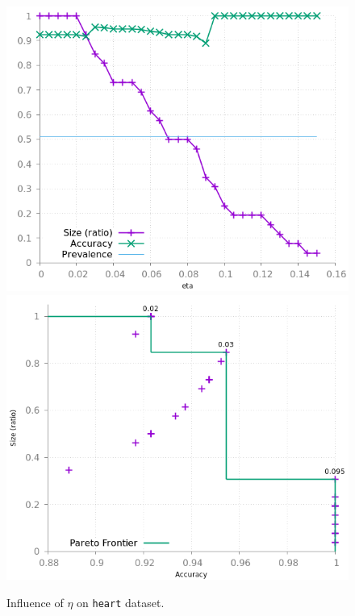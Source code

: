\documentclass[sigconf,edbt]{acmart-edbt-workshops}
\begin{document}
\begin{figure}[!h]
\centering
\includegraphics[scale=0.35]{img/meta_heart.png}
\hfill
\includegraphics[scale=0.35]{img/meta_pareto_heart.png}
\caption{Influence of $\eta$ on \texttt{heart} dataset.}
\label{fig:meta_heart}
\end{figure}
\end{document}
